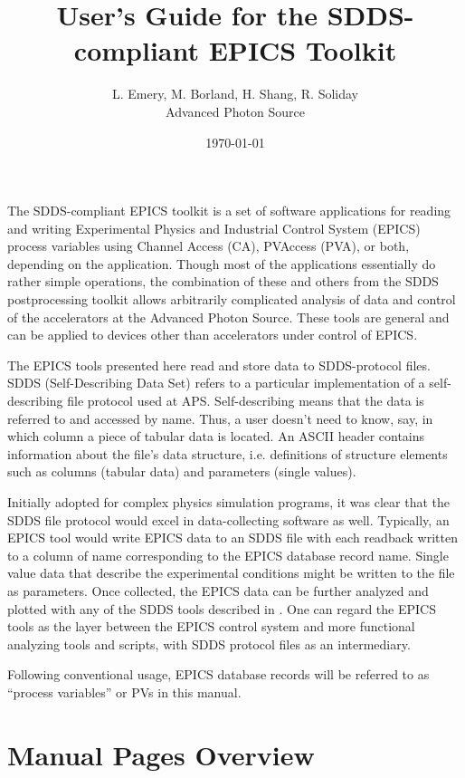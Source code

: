 \documentclass[11pt]{article}
\begin{document}
\title{User's Guide for the SDDS-compliant EPICS Toolkit}
\author{L. Emery, M. Borland, H. Shang, R. Soliday\\Advanced Photon Source\\ \date{\today}}
\maketitle

The SDDS-compliant EPICS toolkit is a set of software applications for
reading and writing Experimental Physics and Industrial Control System
(EPICS) process variables using Channel Access (CA), PVAccess (PVA), or
both, depending on the application. Though most of
the applications essentially do rather simple operations, the
combination of these and others from the SDDS postprocessing toolkit
allows arbitrarily complicated analysis of data and control of the
accelerators at the Advanced Photon Source. These tools are general
and can be applied to devices other than accelerators under control of
EPICS.

The EPICS tools presented here read and store data to SDDS-protocol
files.  SDDS (Self-Describing Data Set)\cite{SDDS_AP1.4} refers to a
particular implementation of a self-describing file protocol used at
APS. Self-describing means that the data is referred to and accessed by
name. Thus, a user doesn't need to know, say, in which column a piece
of tabular data is located. An ASCII header contains information about the
file's data structure, i.e. definitions of structure elements
such as columns (tabular data) and parameters (single values).

Initially adopted for complex physics simulation programs, it was clear
that the SDDS file protocol would excel in data-collecting software as
well. Typically, an EPICS tool would write EPICS data to an SDDS file with
each readback written to a column of name corresponding to the
EPICS database record name. Single value data that describe the experimental conditions
might be written to the file as parameters.
Once collected, the EPICS data can be further analyzed and plotted
with any of the SDDS tools described in \cite{SDDS_AP1.4}.
One can regard the EPICS tools as the layer between the EPICS
control system and more functional analyzing tools and scripts, with
SDDS protocol files as an intermediary.

Following conventional usage, EPICS database records will be referred
to as ``process variables'' or PVs in this manual.

\section{Manual Pages Overview}
\end{document}
